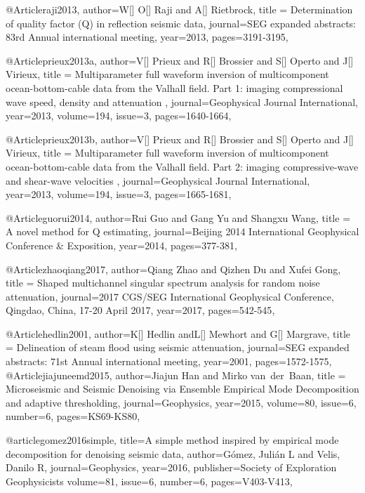@Article{raji2013,
  author={W[] O[] Raji and A[] Rietbrock},
  title = {Determination of quality factor (Q) in reflection seismic data},
  journal={SEG expanded abstracts: 83rd Annual international meeting},
  year=2013,
  pages={3191-3195},
}

@Article{prieux2013a,
  author={V[] Prieux and R[] Brossier and S[] Operto and J[] Virieux},
  title = {Multiparameter full waveform inversion of multicomponent ocean-bottom-cable data from the Valhall field. {P}art 1: imaging compressional wave speed, density and attenuation },
  journal={Geophysical Journal International},
  year=2013,
  volume=194,
  issue=3,
  pages={1640-1664},
}

@Article{prieux2013b,
  author={V[] Prieux and R[] Brossier and S[] Operto and J[] Virieux},
  title = {Multiparameter full waveform inversion of multicomponent ocean-bottom-cable data from the Valhall field. {P}art 2: imaging compressive-wave and shear-wave velocities },
  journal={Geophysical Journal International},
  year=2013,
  volume=194,
  issue=3,
  pages={1665-1681},
}




@Article{guorui2014,
  author={Rui Guo and Gang Yu and Shangxu Wang},
  title = {A novel method for Q estimating},
  journal={Beijing 2014 International Geophysical Conference \& Exposition},
  year=2014,
  pages={377-381},
}

@Article{zhaoqiang2017,
  author={Qiang Zhao and Qizhen Du and Xufei Gong},
  title = {Shaped multichannel singular spectrum analysis for random noise attenuation},
  journal={2017 CGS/SEG International Geophysical Conference, Qingdao, China, 17-20 April 2017},
  year=2017,
  pages={542-545},
}






@Article{hedlin2001,
  author={K[] Hedlin andL[] Mewhort and G[] Margrave},
  title = {Delineation of steam flood using seismic attenuation},
  journal={SEG expanded abstracts: 71st Annual international meeting},
  year=2001,
  pages={1572-1575},
}
@Article{jiajuneemd2015,
  author={Jiajun Han and Mirko van~der~Baan},
  title = {Microseismic and Seismic Denoising via Ensemble Empirical Mode Decomposition and adaptive thresholding},
  journal={Geophysics},
  year=2015,
volume=80,
issue=6,
number=6,
  pages={KS69-KS80},
}

@article{gomez2016simple,
  title={A simple method inspired by empirical mode decomposition for denoising seismic data},
  author={G{\'o}mez, Juli{\'a}n L and Velis, Danilo R},
  journal={Geophysics},
  year={2016},
  publisher={Society of Exploration Geophysicists}
volume=81,
issue=6,
number=6,
  pages={V403-V413},
}


